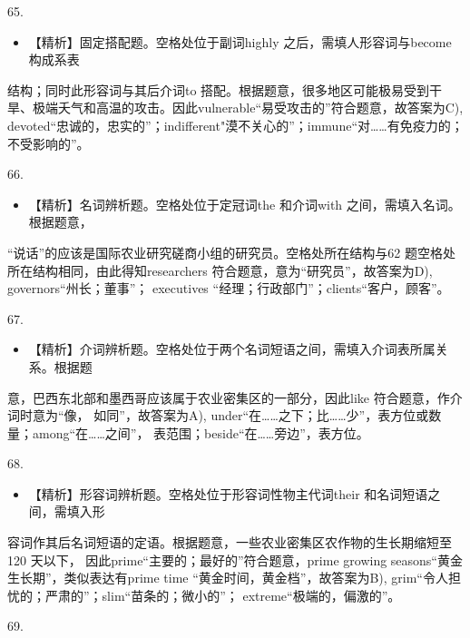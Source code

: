 \documentclass[UTF8,11pt]{ctexart}
\begin{document}
65.


\begin{itemize}[leftmargin=2em,itemsep=.2em,topsep=.4em]\item[C.] 【精析】固定搭配题。空格处位于副词highly 之后，需填人形容词与become 构成系表
\end{itemize}

结构；同时此形容词与其后介词to 搭配。根据题意，很多地区可能极易受到干旱、极端夭气和高温的攻击。因此vulnerable“易受攻击的”符合题意，故答案为C), devoted“忠诚的，忠实的”；indifferent"漠不关心的”；immune“对……有免疫力的；不受影响的”。


66.


\begin{itemize}[leftmargin=2em,itemsep=.2em,topsep=.4em]\item[D.] 【精析】名词辨析题。空格处位于定冠词the 和介词with 之间，需填入名词。根据题意，
\end{itemize}

“说话”的应该是国际农业研究磋商小组的研究员。空格处所在结构与62 题空格处所在结构相同，由此得知researchers 符合题意，意为“研究员”，故答案为D), governors“州长；董事”； executives “经理；行政部门”；clients“客户，顾客”。


67.


\begin{itemize}[leftmargin=2em,itemsep=.2em,topsep=.4em]\item[A.] 【精析】介词辨析题。空格处位于两个名词短语之间，需填入介词表所属关系。根据题
\end{itemize}

意，巴西东北部和墨西哥应该属于农业密集区的一部分，因此like 符合题意，作介词时意为“像， 如同”，故答案为A), under“在……之下；比……少”，表方位或数量；among“在……之间”， 表范围；beside“在……旁边”，表方位。


68.


\begin{itemize}[leftmargin=2em,itemsep=.2em,topsep=.4em]\item[B.] 【精析】形容词辨析题。空格处位于形容词性物主代词their 和名词短语之间，需填入形
\end{itemize}

容词作其后名词短语的定语。根据题意，一些农业密集区农作物的生长期缩短至120 天以下， 因此prime“主要的；最好的”符合题意，prime growing seasons“黄金生长期”，类似表达有prime time “黄金时间，黄金档”，故答案为B), grim“令人担忧的；严肃的”；slim“苗条的；微小的”； extreme“极端的，偏激的”。


69.
\end{document}
